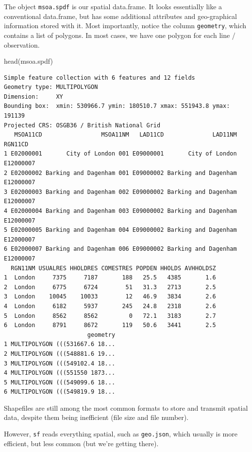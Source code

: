 \documentclass[
  letterpaper,
  DIV=11,
  numbers=noendperiod]{scrreprt}
\newenvironment{Shaded}{\begin{snugshade}}{\end{snugshade}}
\newcommand{\FunctionTok}[1]{\textcolor[rgb]{0.28,0.35,0.67}{#1}}
\newcommand{\NormalTok}[1]{\textcolor[rgb]{0.00,0.23,0.31}{#1}}
\begin{document}
The object \texttt{msoa.spdf} is our spatial data.frame. It looks
essentially like a conventional data.frame, but has some additional
attributes and geo-graphical information stored with it. Most
importantly, notice the column \texttt{geometry}, which contains a list
of polygons. In most cases, we have one polygon for each line /
observation.

\begin{Shaded}
\begin{Highlighting}[]
\FunctionTok{head}\NormalTok{(msoa.spdf)}
\end{Highlighting}
\end{Shaded}

\begin{verbatim}
Simple feature collection with 6 features and 12 fields
Geometry type: MULTIPOLYGON
Dimension:     XY
Bounding box:  xmin: 530966.7 ymin: 180510.7 xmax: 551943.8 ymax: 191139
Projected CRS: OSGB36 / British National Grid
   MSOA11CD                 MSOA11NM   LAD11CD              LAD11NM   RGN11CD
1 E02000001       City of London 001 E09000001       City of London E12000007
2 E02000002 Barking and Dagenham 001 E09000002 Barking and Dagenham E12000007
3 E02000003 Barking and Dagenham 002 E09000002 Barking and Dagenham E12000007
4 E02000004 Barking and Dagenham 003 E09000002 Barking and Dagenham E12000007
5 E02000005 Barking and Dagenham 004 E09000002 Barking and Dagenham E12000007
6 E02000007 Barking and Dagenham 006 E09000002 Barking and Dagenham E12000007
  RGN11NM USUALRES HHOLDRES COMESTRES POPDEN HHOLDS AVHHOLDSZ
1  London     7375     7187       188   25.5   4385       1.6
2  London     6775     6724        51   31.3   2713       2.5
3  London    10045    10033        12   46.9   3834       2.6
4  London     6182     5937       245   24.8   2318       2.6
5  London     8562     8562         0   72.1   3183       2.7
6  London     8791     8672       119   50.6   3441       2.5
                        geometry
1 MULTIPOLYGON (((531667.6 18...
2 MULTIPOLYGON (((548881.6 19...
3 MULTIPOLYGON (((549102.4 18...
4 MULTIPOLYGON (((551550 1873...
5 MULTIPOLYGON (((549099.6 18...
6 MULTIPOLYGON (((549819.9 18...
\end{verbatim}

Shapefiles are still among the most common formats to store and transmit
spatial data, despite them being inefficient (file size and file
number).

However, \texttt{sf} reads everything spatial, such as
\texttt{geo.json}, which usually is more efficient, but less common (but
we're getting there).
\end{document}
